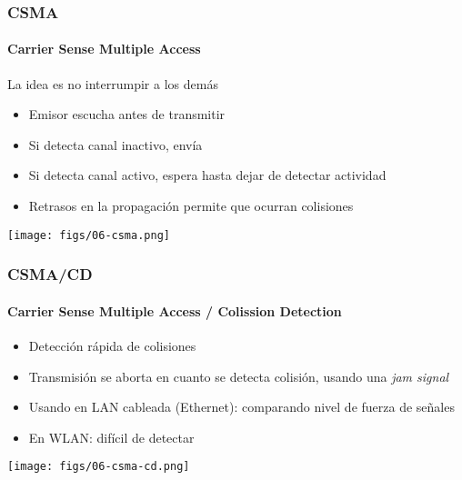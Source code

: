 \documentclass[letter]{beamer}
\begin{document}
\begin{frame}
  \frametitle{CSMA}
  \framesubtitle{Carrier Sense Multiple Access}
  
  La idea es no interrumpir a los demás
  \begin{itemize}
    \item Emisor escucha antes de transmitir
    \item Si detecta canal inactivo, envía
    \item Si detecta canal activo, espera hasta dejar de detectar actividad
    \item Retrasos en la propagación permite que ocurran colisiones
  \end{itemize}

  \begin{center}
    \texttt{[image: figs/06-csma.png]}
  \end{center}


\end{frame}
\begin{frame}
  \frametitle{CSMA/CD}
  \framesubtitle{Carrier Sense Multiple Access / Colission Detection}

  \begin{itemize}
    \item Detección rápida de colisiones
    \item Transmisión se aborta en cuanto se detecta colisión, usando una {\em jam signal}
    \item Usando en LAN cableada (Ethernet): comparando nivel de fuerza de señales
    \item En WLAN: difícil de detectar
  \end{itemize}

  \begin{center}
    \texttt{[image: figs/06-csma-cd.png]}
  \end{center}

\end{frame}
\end{document}
